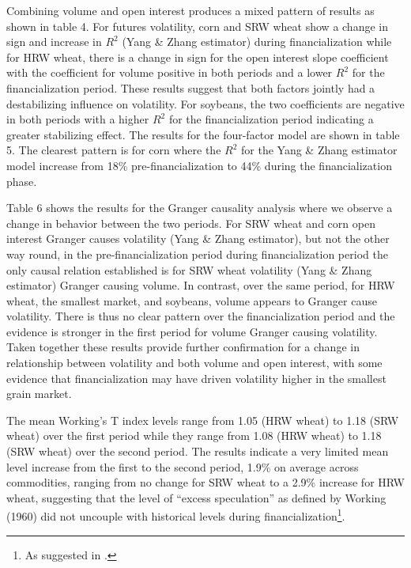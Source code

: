 \documentclass[
]{book}
\let\rmarkdownfootnote\footnote%
\def\footnote{\protect\rmarkdownfootnote}
\begin{document}
Combining volume and open interest produces a mixed pattern of results as shown in table 4. For futures volatility, corn and SRW wheat show a change in sign and increase in \(R^{2}\) (Yang \& Zhang estimator) during financialization while for HRW wheat, there is a change in sign for the open interest slope coefficient with the coefficient for volume positive in both periods and a lower \(R^{2}\) for the financialization period. These results suggest that both factors jointly had a destabilizing influence on volatility. For soybeans, the two coefficients are negative in both periods with a higher \(R^{2}\) for the financialization period indicating a greater stabilizing effect. The results for the four-factor model are shown in table 5. The clearest pattern is for corn where the \(R^{2}\) for the Yang \& Zhang estimator model increase from 18\% pre-financialization to 44\% during the financialization phase.

Table 6 shows the results for the Granger causality analysis where we observe a change in behavior between the two periods. For SRW wheat and corn open interest Granger causes volatility (Yang \& Zhang estimator), but not the other way round, in the pre-financialization period during financialization period the only causal relation established is for SRW wheat volatility (Yang \& Zhang estimator) Granger causing volume. In contrast, over the same period, for HRW wheat, the smallest market, and soybeans, volume appears to Granger cause volatility. There is thus no clear pattern over the financialization period and the evidence is stronger in the first period for volume Granger causing volatility. Taken together these results provide further confirmation for a change in relationship between volatility and both volume and open interest, with some evidence that financialization may have driven volatility higher in the smallest grain market.

The mean Working's T index levels range from 1.05 (HRW wheat) to 1.18 (SRW wheat) over the first period while they range from 1.08 (HRW wheat) to 1.18 (SRW wheat) over the second period. The results indicate a very limited mean level increase from the first to the second period, 1.9\% on average across commodities, ranging from no change for SRW wheat to a 2.9\% increase for HRW wheat, suggesting that the level of ``excess speculation'' as defined by Working (1960) did not uncouple with historical levels during financialization\footnote{As suggested in \citet{sanders_speculative_2010}.}.
\end{document}
